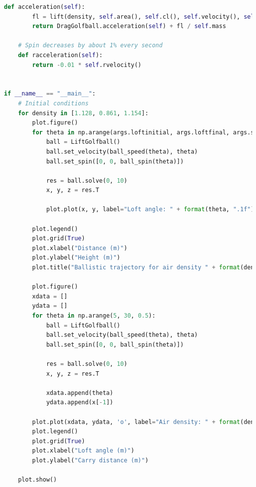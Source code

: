 \documentclass[12pt]{article}
\begin{document}
\begin{lstlisting}[language=Python, caption=Python model, style=PythonStyle, basicstyle=\tiny]
	def acceleration(self):
		fl = lift(density, self.area(), self.cl(), self.velocity(), self.rvelocity())
		return DragGolfball.acceleration(self) + fl / self.mass

	# Spin decreases by about 1% every second
	def racceleration(self):
		return -0.01 * self.rvelocity()


if __name__ == "__main__":
	# Initial conditions
	for density in [1.128, 0.861, 1.154]:
		plot.figure()
		for theta in np.arange(args.loftinitial, args.loftfinal, args.step):
			ball = LiftGolfball()
			ball.set_velocity(ball_speed(theta), theta)
			ball.set_spin([0, 0, ball_spin(theta)])

			res = ball.solve(0, 10)
			x, y, z = res.T

			plot.plot(x, y, label="Loft angle: " + format(theta, ".1f"))

		plot.legend()
		plot.grid(True)
		plot.xlabel("Distance (m)")
		plot.ylabel("Height (m)")
		plot.title("Ballistic trajectory for air density " + format(density, ".3f") + " kg/m^3")

		plot.figure()
		xdata = []
		ydata = []
		for theta in np.arange(5, 30, 0.5):
			ball = LiftGolfball()
			ball.set_velocity(ball_speed(theta), theta)
			ball.set_spin([0, 0, ball_spin(theta)])

			res = ball.solve(0, 10)
			x, y, z = res.T

			xdata.append(theta)
			ydata.append(x[-1])

		plot.plot(xdata, ydata, 'o', label="Air density: " + format(density, ".3f"))
		plot.legend()
		plot.grid(True)
		plot.xlabel("Loft angle (m)")
		plot.ylabel("Carry distance (m)")

	plot.show()
\end{lstlisting}
\end{document}
